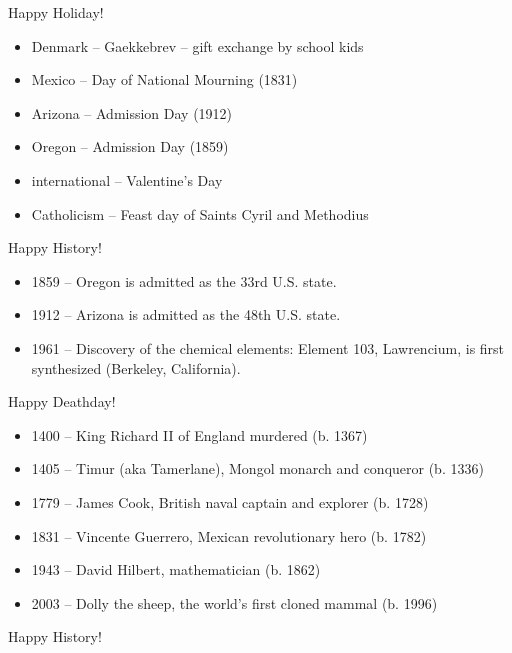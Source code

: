 \documentclass[12pt]{article}
\begin{document}
Happy Holiday!

\vspace{-0.75 cm}
\begin{itemize}\setlength{\itemsep}{-0.12 cm}
\item Denmark -- Gaekkebrev -- gift exchange by school kids
\item Mexico -- Day of National Mourning (1831)
\item Arizona -- Admission Day (1912)
\item Oregon -- Admission Day (1859)
\item international -- Valentine's Day
\item Catholicism -- Feast day of Saints Cyril and Methodius 
\end{itemize}

Happy History!

\vspace{-0.75 cm}
\begin{itemize}\setlength{\itemsep}{-0.12 cm}
\item 1859 -- Oregon is admitted as the 33rd U.S. state.
\item 1912 -- Arizona is admitted as the 48th U.S. state.
\item 1961 -- Discovery of the chemical elements: Element 103, Lawrencium, is first synthesized (Berkeley, California).
\end{itemize}

Happy Deathday!

\vspace{-0.75 cm}
\begin{itemize}\setlength{\itemsep}{-0.12 cm}\renewcommand{\labelitemi}{$\heartsuit$}
\item 1400 -- King Richard II of England murdered (b. 1367)
\item 1405 -- Timur (aka Tamerlane), Mongol monarch and conqueror (b. 1336)
\item 1779 -- James Cook, British naval captain and explorer (b. 1728)
\item 1831 -- Vincente Guerrero, Mexican revolutionary hero (b. 1782)
\item 1943 -- David Hilbert, mathematician (b. 1862)
\item 2003 -- Dolly the sheep, the world's first cloned mammal (b. 1996)
\end{itemize}

Happy History!
\end{document}
